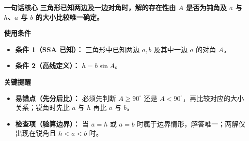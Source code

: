 \begin{summarybox}
	\textbf{\textcolor{CSummary}{一句话核心}}
	\textbf{三角形已知两边及一边对角时，解的存在性由 $A$ 是否为钝角及 $a$ 与 $h$、$a$ 与 $b$ 的大小比较唯一确定。}

	\medskip
	\textbf{\textcolor{CSummary}{使用条件}}
	\begin{itemize}[leftmargin=*, itemsep=0.5em, topsep=0.4em]
		\item \textbf{条件 1（SSA 已知）：} 三角形中已知两边 $a,b$ 及其中一边 $a$ 的对角 $A$。
		\item \textbf{条件 2（高线定义）：} $h = b\sin A$。
	\end{itemize}

	\medskip
	\textbf{\textcolor{CSummary}{关键提醒}}
	\begin{itemize}[leftmargin=*, itemsep=0.5em, topsep=0.4em]
		\item \textbf{易错点（先分后比）：} 必须先判断 $A\geq90^\circ$ 还是 $A<90^\circ$，再比较对应的大小关系；锐角时先比 $a$ 与 $h$ 再比 $a$ 与 $b$。
		\item \textbf{检查项（验算边界）：} 当 $a=h$ 或 $a=b$ 时属于边界情形，解答唯一；两解仅出现在锐角且 $h<a<b$ 时。
	\end{itemize}

\end{summarybox}
